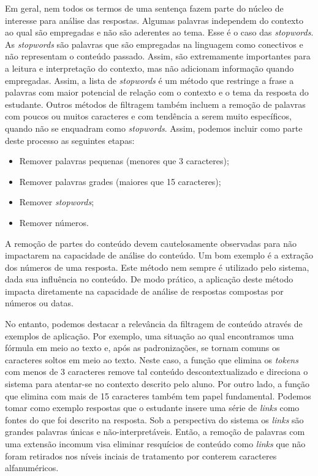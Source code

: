 Em geral, nem todos os termos de uma sentença fazem parte do núcleo de interesse para análise das respostas. Algumas palavras independem do contexto ao qual são empregadas e não são aderentes ao tema. Esse é o caso das \textit{stopwords}. As \textit{stopwords} são palavras que são empregadas na linguagem como conectivos e não representam o conteúdo passado. Assim, são extremamente importantes para a leitura e interpretação do contexto, mas não adicionam informação quando empregadas. Assim, a lista de \textit{stopwords} é um método que restringe a frase a palavras com maior potencial de relação com o contexto e o tema da resposta do estudante. Outros métodos de filtragem também incluem a remoção de palavras com poucos ou muitos caracteres e com tendência a serem muito específicos, quando não se enquadram como \textit{stopwords}. Assim, podemos incluir como parte deste processo as seguintes etapas:

\begin{itemize}
	\item Remover palavras pequenas (menores que 3 caracteres);
	\item Remover palavras grades (maiores que 15 caracteres);
	\item Remover \textit{stopwords};
	\item Remover números.
\end{itemize}

A remoção de partes do conteúdo devem cautelosamente observadas para não impactarem na capacidade de análise do conteúdo. Um bom exemplo é a extração dos números de uma resposta. Este método nem sempre é utilizado pelo sistema, dada sua influência no conteúdo. De modo prático, a aplicação deste método impacta diretamente na capacidade de análise de respostas compostas por números ou datas. 

No entanto, podemos destacar a relevância da filtragem de conteúdo através de exemplos de aplicação. Por exemplo, uma situação ao qual encontramos uma fórmula em meio ao texto e, após as padronizações, se tornam comuns os caracteres soltos em meio ao texto. Neste caso, a função que elimina os \textit{tokens} com menos de 3 caracteres remove tal conteúdo descontextualizado e direciona o sistema para atentar-se no contexto descrito pelo aluno. Por outro lado, a função que elimina com mais de 15 caracteres também tem papel fundamental. Podemos tomar como exemplo respostas que o estudante insere uma série de \textit{links} como fontes do que foi descrito na resposta. Sob a perspectiva do sistema os \textit{links} são grandes palavras únicas e não-interpretáveis. Então, a remoção de palavras com uma extensão incomum visa eliminar resquícios de conteúdo como \textit{links} que não foram retirados nos níveis inciais de tratamento por conterem caracteres alfanuméricos.

